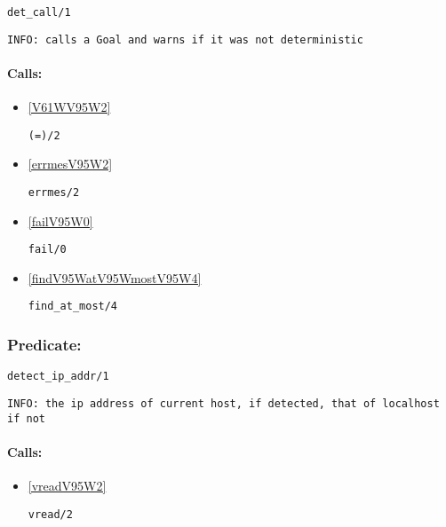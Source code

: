 \begin{verbatim}
det_call/1
\end{verbatim}

{\small \begin{verbatim}
INFO: calls a Goal and warns if it was not deterministic

\end{verbatim}}
\paragraph{Calls:} 
\begin{itemize}
\item \ref{V61WV95W2} 
\begin{verbatim}
(=)/2
\end{verbatim}

\item \ref{errmesV95W2} 
\begin{verbatim}
errmes/2
\end{verbatim}

\item \ref{failV95W0} 
\begin{verbatim}
fail/0
\end{verbatim}

\item \ref{findV95WatV95WmostV95W4} 
\begin{verbatim}
find_at_most/4
\end{verbatim}

\end{itemize}

\subsubsection{Predicate:} \label{detectV95WipV95WaddrV95W1}

\begin{verbatim}
detect_ip_addr/1
\end{verbatim}

{\small \begin{verbatim}
INFO: the ip address of current host, if detected, that of localhost if not

\end{verbatim}}
\paragraph{Calls:} 
\begin{itemize}
\item \ref{vreadV95W2} 
\begin{verbatim}
vread/2
\end{verbatim}

\end{itemize}

